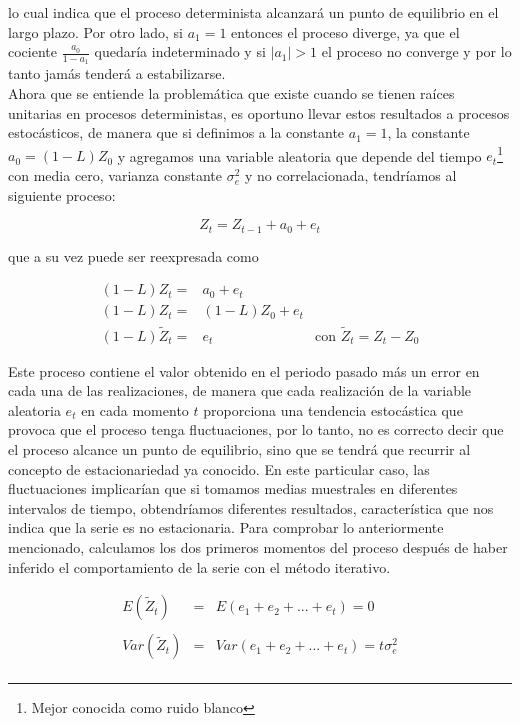 lo cual  indica que el proceso determinista alcanzará un punto de equilibrio en el largo plazo. Por otro lado, si $a_1=1$ entonces el proceso diverge, ya que el cociente $\frac{a_0}{1-a_1}$ quedaría indeterminado y si  $\left | a_1 \right |>1$ el proceso no converge y por lo tanto jamás tenderá a estabilizarse.\\

Ahora que se entiende la problemática que existe cuando se tienen raíces unitarias en procesos deterministas, es oportuno llevar estos resultados a procesos estocásticos, de manera que si definimos a la constante $a_1=1$, la constante $a_0=(1-L)Z_0$ y agregamos una variable aleatoria que depende del tiempo $e_t$\footnote{ Mejor conocida como ruido blanco} con media cero, varianza constante $\sigma_e^2$ y no correlacionada, tendríamos al siguiente proceso:

\begin{equation}
Z_t= Z_{t-1} + a_0 + e_t
\end{equation} 

que a su vez puede ser reexpresada como

\begin{eqnarray}\label{eq:AR1} 
(1-L)Z_t =& a_0 + e_t & \nonumber \\
(1-L)Z_t =& (1-L)Z_0 + e_t & \nonumber \\
(1-L)\tilde{Z}_t =& e_t & \mbox{con $\tilde{Z}_t =Z_t-Z_0$}
\end{eqnarray}
 

Este proceso contiene el valor obtenido en el periodo pasado más un error en cada una de las realizaciones, de manera que cada realización de la variable aleatoria ${e_t}$ en cada momento $t$ proporciona una tendencia estocástica que provoca que el proceso tenga fluctuaciones, por lo tanto, no es correcto decir que el proceso alcance un punto de equilibrio, sino que se tendrá que recurrir al concepto de estacionariedad ya conocido. En este particular caso, las fluctuaciones implicarían que si tomamos medias muestrales en diferentes intervalos de tiempo, obtendríamos diferentes resultados, característica  que nos indica que la serie es no estacionaria. Para comprobar lo anteriormente mencionado, calculamos los dos primeros momentos del proceso después de haber inferido el comportamiento de la serie con el m\'etodo iterativo.

 \begin{eqnarray}
 E(\tilde{Z}_t) &  =&   E(e_1+ e_2+...+e_t)= 0 \nonumber  \\ 
         &  &    \\
         Var(\tilde{Z}_t) & =& Var(e_1+e_2+...+e_t)=t \sigma_e^2  \nonumber \\
 & &  \nonumber 
\end{eqnarray} 


